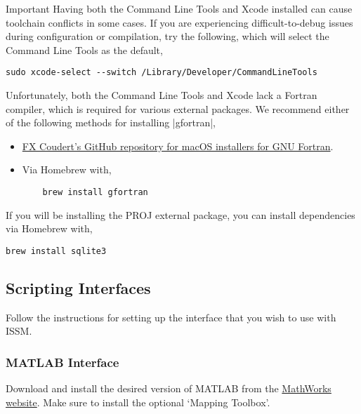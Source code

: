 \begin{calloutHighlight}{Important}
Having both the Command Line Tools and Xcode installed can cause toolchain conflicts in some cases. If you are experiencing difficult-to-debug issues during configuration or compilation, try the following, which will select the Command Line Tools as the default,
\begin{lstlisting}
sudo xcode-select --switch /Library/Developer/CommandLineTools
\end{lstlisting}
\end{calloutHighlight}

Unfortunately, both the Command Line Tools and Xcode lack a Fortran compiler, which is required for various external packages. We recommend either of the following methods for installing \lstinlinebg|gfortran|,
\begin{itemize}
	\item \href{https://github.com/fxcoudert/gfortran-for-macOS}{FX Coudert's GitHub repository for macOS installers for GNU Fortran}.
	\item Via Homebrew with,
	\begin{lstlisting}
	brew install gfortran
	\end{lstlisting}
\end{itemize}

If you will be installing the PROJ external package, you can install dependencies via Homebrew with,
\begin{lstlisting}
brew install sqlite3
\end{lstlisting}

\subsection{Scripting Interfaces}
Follow the instructions for setting up the interface that you wish to use with ISSM.

\subsubsection{MATLAB Interface}
Download and install the desired version of MATLAB from the \href{https://www.mathworks.com}{MathWorks website}. Make sure to install the optional `Mapping Toolbox'.

